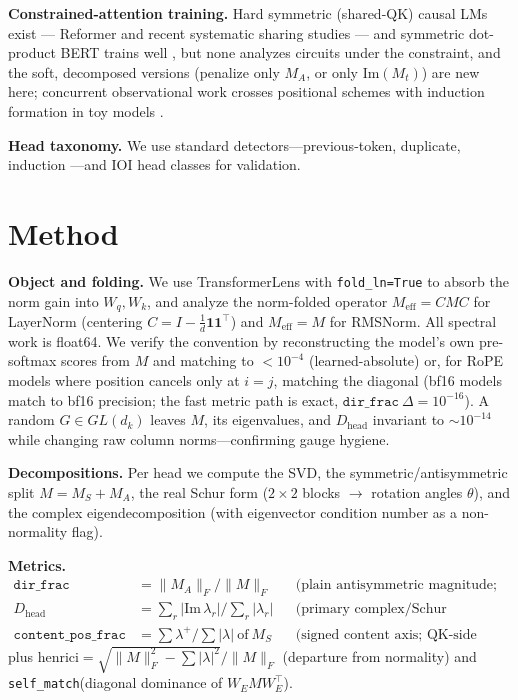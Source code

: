\documentclass[11pt]{article}
\newcommand{\dirfrac}{\texttt{dir\_frac}\xspace}
\newcommand{\Dhead}{\ensuremath{D_{\text{head}}}\xspace}
\newcommand{\contentpos}{\texttt{content\_pos\_frac}\xspace}
\newcommand{\selfmatch}{\texttt{self\_match}\xspace}
\newcommand{\M}{\ensuremath{M}\xspace}
\newcommand{\MS}{\ensuremath{M_S}\xspace}
\newcommand{\MA}{\ensuremath{M_A}\xspace}
\newcommand{\Mt}{\ensuremath{M_t}\xspace}
\newcommand{\Wq}{\ensuremath{W_q}}
\newcommand{\Wk}{\ensuremath{W_k}}
\newcommand{\Rope}{RoPE\xspace}
\begin{document}
\textbf{Constrained-attention training.} Hard symmetric (shared-QK) causal LMs exist --- Reformer
\citep{kitaev2020reformer} and recent systematic sharing studies --- and symmetric dot-product BERT trains well
\citep{courtois2024symmetric}, but none analyzes circuits under the constraint, and the soft, decomposed versions
(penalize only \MA, or only $\mathrm{Im}(\Mt)$) are new here; concurrent observational work crosses positional
schemes with induction formation in toy models \citep{huang2026dissecting}.

\textbf{Head taxonomy.} We use standard detectors---previous-token, duplicate, induction \citep{olsson2022induction}---and
IOI \citep{wang2022ioi} head classes for validation.

\section{Method}\label{sec:method}
\textbf{Object and folding.} We use TransformerLens with \texttt{fold\_ln=True} to absorb the norm gain into $\Wq,\Wk$,
and analyze the norm-folded operator $M_{\text{eff}}=C\M C$ for LayerNorm (centering $C=I-\tfrac1d\mathbf{1}\mathbf{1}^\top$)
and $M_{\text{eff}}=\M$ for RMSNorm. All spectral work is float64. We verify the convention by reconstructing the
model's own pre-softmax scores from \M and matching to $<10^{-4}$ (learned-absolute) or, for \Rope models where position
cancels only at $i{=}j$, matching the diagonal (bf16 models match to bf16 precision; the fast metric path is exact,
$\dirfrac\ \Delta{=}10^{-16}$). A random $G\in GL(d_k)$ leaves \M, its eigenvalues, and \Dhead invariant to ${\sim}10^{-14}$
while changing raw column norms---confirming gauge hygiene.

{\sloppy\textbf{Decompositions.} Per head we compute the SVD, the symmetric/antisymmetric split $\M{=}\MS{+}\MA$,
the real Schur form ($2\times2$ blocks $\to$ rotation angles $\theta$), and the complex eigendecomposition (with
eigenvector condition number as a non-normality flag).\par}

\textbf{Metrics.}
\begin{align}
\dirfrac &= \|\MA\|_F/\|\M\|_F && \text{(plain antisymmetric magnitude; Saponati's score)}\\
\Dhead &= \textstyle\sum_r |\mathrm{Im}\,\lambda_r| \big/ \sum_r |\lambda_r| && \text{(primary complex/Schur directionality)}\\
\contentpos &= \textstyle\sum \lambda^+ \big/ \sum |\lambda| \ \text{of}\ \MS && \text{(signed content axis; QK-side echo of OV positivity)}
\end{align}
plus $\text{henrici}=\sqrt{\|\M\|_F^2-\sum|\lambda|^2}/\|\M\|_F$ (departure from normality) and \selfmatch (diagonal
dominance of $W_E \M W_E^\top$).
\end{document}
